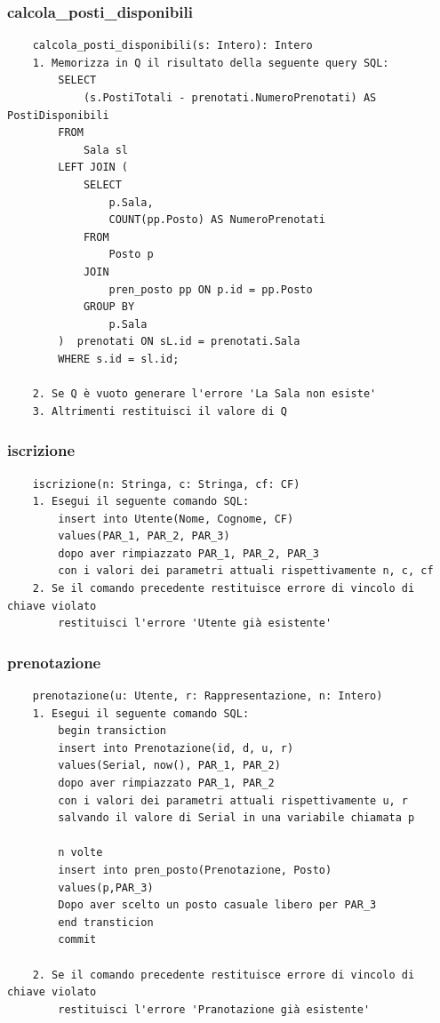 \documentclass[12pt, letterpaper]{article}
\begin{document}
\subsubsection{calcola\_posti\_disponibili}
\begin{verbatim}
    calcola_posti_disponibili(s: Intero): Intero
    1. Memorizza in Q il risultato della seguente query SQL:
        SELECT 
            (s.PostiTotali - prenotati.NumeroPrenotati) AS PostiDisponibili
        FROM 
            Sala sl
        LEFT JOIN (
            SELECT 
                p.Sala,
                COUNT(pp.Posto) AS NumeroPrenotati
            FROM 
                Posto p
            JOIN 
                pren_posto pp ON p.id = pp.Posto
            GROUP BY 
                p.Sala
        )  prenotati ON sL.id = prenotati.Sala 
        WHERE s.id = sl.id;

    2. Se Q è vuoto generare l'errore 'La Sala non esiste'
    3. Altrimenti restituisci il valore di Q
\end{verbatim}
\subsubsection{iscrizione}
\begin{verbatim}
    iscrizione(n: Stringa, c: Stringa, cf: CF)
    1. Esegui il seguente comando SQL:
        insert into Utente(Nome, Cognome, CF)
        values(PAR_1, PAR_2, PAR_3)
        dopo aver rimpiazzato PAR_1, PAR_2, PAR_3 
        con i valori dei parametri attuali rispettivamente n, c, cf
    2. Se il comando precedente restituisce errore di vincolo di chiave violato
        restituisci l'errore 'Utente già esistente'
\end{verbatim}
\subsubsection{prenotazione}
\begin{verbatim}
    prenotazione(u: Utente, r: Rappresentazione, n: Intero)
    1. Esegui il seguente comando SQL:
        begin transiction 
        insert into Prenotazione(id, d, u, r)
        values(Serial, now(), PAR_1, PAR_2)
        dopo aver rimpiazzato PAR_1, PAR_2 
        con i valori dei parametri attuali rispettivamente u, r
        salvando il valore di Serial in una variabile chiamata p

        n volte 
        insert into pren_posto(Prenotazione, Posto)
        values(p,PAR_3) 
        Dopo aver scelto un posto casuale libero per PAR_3
        end transticion 
        commit

    2. Se il comando precedente restituisce errore di vincolo di chiave violato
        restituisci l'errore 'Pranotazione già esistente'

\end{verbatim}
\end{document}
